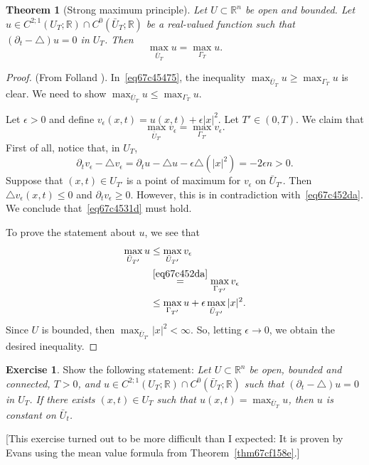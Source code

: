 \documentclass[a4paper,9pt]{amsart}
\newcommand{\R}{\mathbb{R}}	%
\newcommand{\de}{\partial}		%
\newcommand{\laplacian}{\triangle}
\theoremstyle{plain}
\newtheorem{theorem}[proposition]{Theorem}
\theoremstyle{definition}
\newtheorem{exercise}[proposition]{Exercise}%
\theoremstyle{remark}
\begin{document}
\begin{theorem}[Strong maximum principle]\label{thm67c44b0d}
	Let $U\subset\R^n$ be open and bounded.
	Let $u\in C^{2;1}(U_T;\R)\cap C^0(\bar U_T;\R)$ be a real-valued function such that $(\de_t-\laplacian)u=0$ in $U_T$.
	Then
	\begin{equation}\label{eq67c45475}
		\max_{\bar U_T} u = \max_{\Gamma_T} u .
	\end{equation}
\end{theorem}
\begin{proof}
	(From Folland \cite[Thm 4.16]{MR1357411}).	
	In~\eqref{eq67c45475}, the inequality $\max_{\bar U_T} u \ge \max_{\Gamma_T} u$ is clear.
	We need to show $\max_{\bar U_T} u \le \max_{\Gamma_T} u$.
	
	Let $\epsilon>0$ and define $v_\epsilon(x,t) = u(x,t) + \epsilon |x|^2$.
	Let $T'\in (0,T)$.
	We claim that
	\begin{equation}\label{eq67c4531d}
		\max_{\bar U_{T'}} v_\epsilon = \max_{\Gamma_{T'}} v_\epsilon .
	\end{equation}
	First of all, notice that, in $U_T$,
	\begin{equation}\label{eq67c452da}
	\de_tv_\epsilon - \laplacian v_\epsilon 
	= \de_t u - \laplacian u - \epsilon \laplacian(|x|^2) 
	= -2\epsilon n >0 .
	\end{equation}
	Suppose that $(x,t)\in U_{T'}$ is a point of maximum for $v_\epsilon$ on $\bar U_{T'}$.
	Then $\laplacian v_\epsilon(x,t) \le 0$ and $\de_t v_\epsilon \ge 0$.
	However, this is in contradiction with~\eqref{eq67c452da}.
	We conclude that~\eqref{eq67c4531d} must hold.
	
	To prove the statement about $u$, we see that
	\begin{align*}
	 	\max_{\bar U_{T'}} u 
		&\le \max_{\bar U_{T'}} v_\epsilon \\
		&\overset{\eqref{eq67c452da}}= \max_{\Gamma_{T'}} v_\epsilon \\
		&\le \max_{\Gamma_{T'}} u + \epsilon \max_{\bar U_{T'}} |x|^2 .
	\end{align*}
	Since $U$ is bounded, then $ \max_{\bar U_{T'}} |x|^2<\infty$.
	So, letting $\epsilon\to0$, we obtain the desired inequality.
\end{proof}

\begin{exercise}
	Show the following statement:
	{\it 
	Let $U\subset\R^n$ be open, bounded and connected, $T>0$,
	and $u\in C^{2;1}(U_T;\R)\cap C^0(\bar U_T;\R)$ such that $(\de_t-\laplacian)u=0$ in $U_T$.
	If there exists $(x,t)\in U_T$ such that $u(x,t) = \max_{\bar U_T} u$, then $u$ is constant on $\bar U_t$.}
	
	[This exercise turned out to be more difficult than I expected: It is proven by Evans using the mean value formula from Theorem~\ref{thm67cf158e}.]
\end{exercise}
\end{document}

